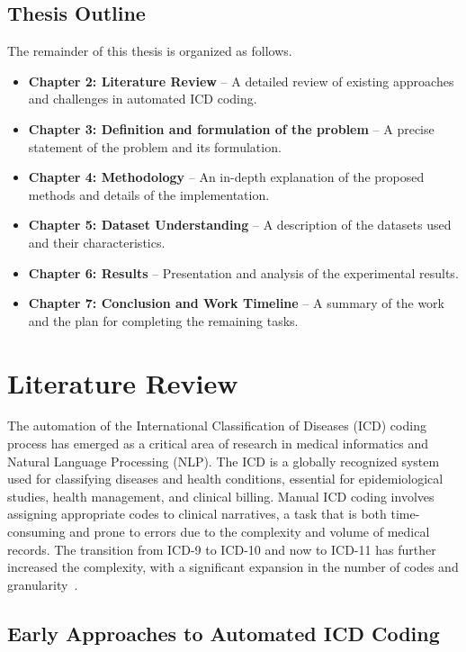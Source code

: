 \documentclass[12pt,a4paper]{report}
\begin{document}
\section{Thesis Outline}
The remainder of this thesis is organized as follows.
\begin{itemize}
    \item \textbf{Chapter 2: Literature Review} – A detailed review of existing approaches and challenges in automated ICD coding.
    \item \textbf{Chapter 3: Definition and formulation of the problem} – A precise statement of the problem and its formulation.
    \item \textbf{Chapter 4: Methodology} – An in-depth explanation of the proposed methods and details of the implementation.
    \item \textbf{Chapter 5: Dataset Understanding} – A description of the datasets used and their characteristics.
    \item \textbf{Chapter 6: Results} – Presentation and analysis of the experimental results.
    \item \textbf{Chapter 7: Conclusion and Work Timeline} – A summary of the work and the plan for completing the remaining tasks.
\end{itemize}

\chapter{Literature Review}

The automation of the International Classification of Diseases (ICD) coding process has emerged as a critical area of research in medical informatics and Natural Language Processing (NLP). The ICD is a globally recognized system used for classifying diseases and health conditions, essential for epidemiological studies, health management, and clinical billing. Manual ICD coding involves assigning appropriate codes to clinical narratives, a task that is both time-consuming and prone to errors due to the complexity and volume of medical records. The transition from ICD-9 to ICD-10 and now to ICD-11 has further increased the complexity, with a significant expansion in the number of codes and granularity~\cite{who2019icd11}.

\section{Early Approaches to Automated ICD Coding}
\end{document}
